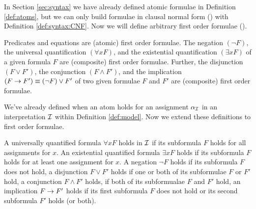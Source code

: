 In Section \ref{sec:syntax} we have already defined atomic formulae in Definition \ref{def:atoms}, 
but we can only build formulae in clausal normal form (\CNF) with Definition \vref{def:syntax:CNF}.
Now we will define arbitrary first order formulae (\FOF).

\begin{definition}[\FOF]\label{def:syntax:FOF}
	Predicates and equations are (atomic) first order formulae. 
	The negation $(\lnot F)$, 
	the universal quantification $(\forall x F)$, 
	and the existential quantification $(\exists x F)$ 
	of a given formula $F$ are (composite) first order formulae.
	Further, the disjunction $(F \lor F')$, 
	the conjunction $(F \land F') $, 
	and the implication $(F \rightarrow F') \equiv (\lnot F) \lor F'$ 
	of two given formulae $F$ and $F'$ 
	are (composite) first order formulae.
\end{definition}

We've already defined when an atom holds for an assignment $\alpha_{\mathcal I}$ 
in an interpretation ${\mathcal I}$ within Definition \vref{def:model}.
Now we extend these definitions to first order formulae.

\begin{definition}\label{def:semantics:FOF}
	
	A universally quantified formula $\forall x F$ holds in ${\mathcal I}$ if its subformula $F$ holds for all assignments for $x$.
	An existential quantified formula $\exists xF$ holds if its subformula $F$ holds for at least one assignment for $x$.
	A negation $\lnot F$ holds if its subformula $F$ does not hold, 
	a disjunction $F\lor F'$ holds if one or both of its subformulae $F$ or $F'$ hold,
	a conjunction $F\land F'$ holds, if both of its subformualae $F$ and $F'$ hold, 
	an implication $F\rightarrow F'$ holds if its first subformula $F$ does not hold or its second subformula $F'$ holds (or both).
\end{definition}


